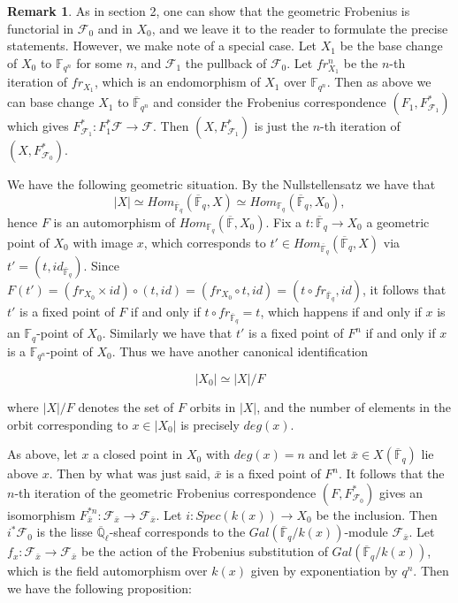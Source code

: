 \documentclass{ucbthesis}
\theoremstyle{definition}
\newtheorem{rmk}[thm]{Remark}
\theoremstyle{theorem}
\begin{document}
\begin{rmk}
As in section 2, one can show that the geometric Frobenius is functorial in $\mathcal{F}_0$ and in $X_{0}$, and we leave it to the reader to formulate the precise statements. However, we make note of a special case. Let $X_{1}$ be the base change of $X_{0}$ to $\mathbb{F}_{q^{n}}$ for some $n$, and $\mathcal{F}_{1}$ the pullback of $\mathcal{F}_{0}$. Let $fr_{X_1}^{n}$ be the $n$-th iteration of $fr_{X_1}$, which is an endomorphism of $X_{1}$ over $\mathbb{F}_{q^{n}}$. Then as above we can base change $X_1$ to $\overline{\mathbb{F}}_{q^{n}}$ and consider the Frobenius correspondence $(F_1,F^{*}_{\mathcal{F}_1})$ which gives $F^{*}_{\mathcal{F}_1}:F_{1}^{*}\mathcal{F} \rightarrow \mathcal{F}$. Then $(X,F^{*}_{\mathcal{F}_1})$ is just the $n$-th iteration of $(X,F_{\mathcal{F}_{0}}^{*})$. 
\end{rmk}


We have the following geometric situation. By the Nullstellensatz we have that
$$ |X| \simeq Hom_{\overline{\mathbb{F}}_{q}}(\overline{\mathbb{F}}_{q},X) \simeq Hom_{\mathbb{F}_{q}}(\overline{\mathbb{F}}_{q},X_0),$$
hence $F$ is an automorphism of $Hom_{\mathbb{F}_{q}}(\overline{\mathbb{F}},X_0)$. Fix a $t:\overline{\mathbb{F}}_{q}\rightarrow X_0$ a geometric point of $X_0$ with image $x$, which corresponds to $t'\in Hom_{\overline{\mathbb{F}}_{q}}(\overline{\mathbb{F}}_{q},X)$ via $t' = (t,id_{\overline{\mathbb{F}}_{q}})$. Since $F(t') = (fr_{X_0}\times id)\circ (t,id) = (fr_{X_0}\circ t,id) = (t\circ fr_{\overline{\mathbb{F}}_{q}},id)$, it follows that $t'$ is a fixed point of $F$ if and only if $t\circ fr_{\overline{\mathbb{F}}_{q}} =t$, which happens if and only if $x$ is an $\mathbb{F}_{q}$-point of $X_0$. Similarly we have that $t'$ is a fixed point of $F^{n}$ if and only if $x$ is a $\mathbb{F}_{q^n}$-point of $X_{0}$. Thus we have another canonical identification

$$|X_0| \simeq |X|/{F}$$

where $|X|/{F}$ denotes the set of $F$ orbits in $|X|$, and the number of elements in the orbit corresponding to $x\in |X_0|$ is precisely $deg(x)$.  

As above, let $x$ a closed point in $X_{0}$ with $deg(x) = n$ and let $\bar{x}\in
 X(\overline{\mathbb{F}}_{q})$ lie above $x$. Then by what was just said, $\bar{x}$ is a
  fixed point of $F^{n}$. It follows that the $n$-th iteration of the geometric Frobenius correspondence $(F, F^{*}_{\mathcal{F}_{0}})$ gives an isomorphism $F^{*n}_{\bar{x}}:\mathcal{F}_{\bar{x}}\rightarrow
   \mathcal{F}_{\bar{x}}$. Let $i:Spec(k(x)) \rightarrow X_{0}$ be the inclusion. Then $i^{*}\mathcal{F}_{0}$  is the lisse $\overline{\mathbb{Q}}_{\ell}$-sheaf corresponds to the $Gal(\overline{\mathbb{F}}_{q}/k(x))$-module $\mathcal{F}_{\bar{x}}$. Let $f_{x}:\mathcal{F}_{\bar{x}} \rightarrow \mathcal{F}_{\bar{x}}$ be the action of the Frobenius
      substitution of $Gal(\overline{\mathbb{F}}_{q}/k(x))$, which is the field automorphism over $k(x)$ given by exponentiation by $q^{n}$. Then we have the following proposition:
\end{document}
